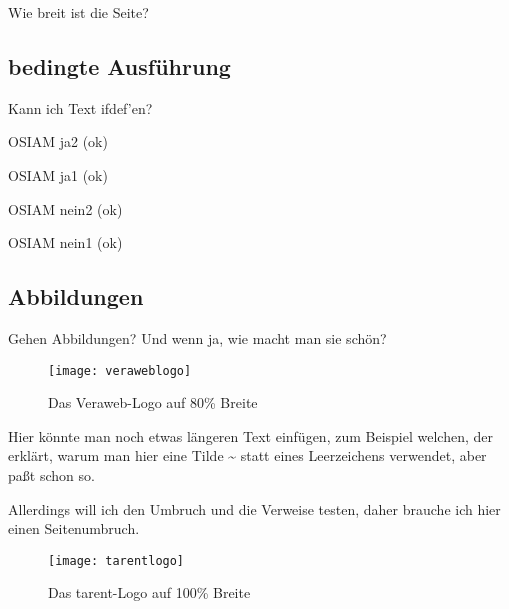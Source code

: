\documentclass{tarentanleitung}
\begin{document}
Wie breit ist die Seite? %

\the\textwidth

\subsection{bedingte Ausführung}

Kann ich Text ifdef'en?

\newif\ifosiam
\osiamtrue

\ifosiam
 OSIAM ja2 (ok)
\else
 OSIAM nein2
\fi

\ifosiam
 OSIAM ja1 (ok)
\fi

\ifosiam\else
 OSIAM nein1
\fi

\osiamfalse

\ifosiam
 OSIAM ja2
\else
 OSIAM nein2 (ok)
\fi

\ifosiam
 OSIAM ja1
\fi

\ifosiam\else
 OSIAM nein1 (ok)
\fi

\subsection{Abbildungen}

Gehen Abbildungen? Und wenn ja, wie macht man sie schön?

\begin{figure}[h!]
 \centering\texttt{[image: veraweblogo]}
 \caption{Das Veraweb-Logo auf 80\% Breite}
 \label{fig:logovw}
\end{figure}

Hier könnte man noch etwas längeren Text einfügen, zum Beispiel
welchen, der erklärt, warum man hier eine Tilde \~{} statt eines
Leerzeichens verwendet, aber paßt schon so.

\newpage

Allerdings will ich den Umbruch und die Verweise testen, daher
brauche ich hier einen Seitenumbruch.

\begin{figure}[h!]
 \centering\texttt{[image: tarentlogo]}
 \caption{Das tarent-Logo auf 100\% Breite}
 \label{fig:logotarent}
\end{figure}
\end{document}
